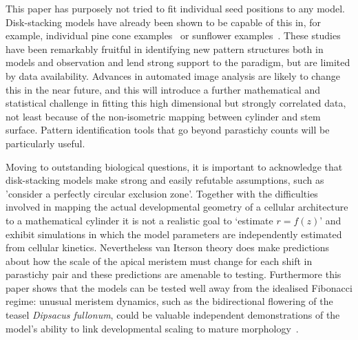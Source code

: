 \documentclass[a4paper,10pt]{amsart}
\begin{document}
This paper has purposely not tried to fit individual seed positions to any model.  Disk-stacking models have already been shown to be capable of this in, for example, individual pine cone examples~\cite{douadyFibonacciQuasisymmetricPhyllotaxis2016} or sunflower examples~\cite{hottonPossibleActualPhyllotaxis2006}. These studies have been remarkably fruitful in identifying new pattern structures both in models and observation and lend strong support to the paradigm, but are limited by data availability.  Advances in automated image analysis are likely to change this in the near future, and this will introduce a further mathematical and statistical challenge in fitting this high dimensional but strongly correlated data, not least because of the non-isometric mapping between cylinder and stem surface. Pattern identification tools that go beyond parastichy counts will be particularly useful.


Moving to outstanding biological questions, it is important 
to acknowledge that disk-stacking models make strong and easily refutable assumptions, such as 'consider a perfectly circular exclusion zone'. Together with the difficulties involved in mapping the actual developmental geometry of a cellular architecture to a mathematical cylinder it is not a realistic goal to `estimate $r=f(z)$' and exhibit simulations in which the model parameters are independently estimated from cellular kinetics. Nevertheless van Iterson theory does make predictions about how the scale of the apical meristem must change for each shift in parastichy pair and these predictions are amenable to testing. Furthermore this paper shows that the models can be tested well away from the idealised Fibonacci regime: unusual meristem dynamics, such as the bidirectional flowering of the teasel \textit{Dipsacus fullonum}, could be valuable independent demonstrations of the model's ability to link developmental scaling to mature morphology~\cite{naghilooUnderstandingUniqueFlowering2017a}.
\end{document}
